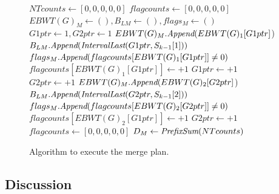 \begin{figure}


	
	\begin{algorithmic}
		
		\State {}
		\State {}
		\State $NTcounts \leftarrow [0,0,0,0,0]$
		\State $flagcounts \leftarrow [0,0,0,0,0]$
		\State $EBWT(G)_M \leftarrow (), B_{LM} \leftarrow (), flags_M \leftarrow ()$
		\State $G1ptr \leftarrow 1, G2ptr \leftarrow 1$
		\State $EBWT(G)_M.\emph{Append}(EBWT(G)_1[G1ptr]$)
		\State $B_{LM}.\emph{Append}(\emph{IntervalLast}(G1ptr, S_{k-1}[1]))$
		\State $flags_M.\emph{Append}(flagcounts[EBWT(G)_1[G1ptr]] \neq 0)$
		\State $flagcounts[EBWT(G)_1[G1ptr]] \leftarrow +1$
		\State $G1ptr \leftarrow +1$
		\State $G2ptr \leftarrow +1$
		\EndIf
		\Else
		\State $EBWT(G)_M.\emph{Append}(EBWT(G)_2[G2ptr]$)
		\State $B_{LM}.\emph{Append}(\emph{IntervalLast}(G2ptr, S_{k-1}[2]))$
		\State $flags_M.\emph{Append}(flagcounts[EBWT(G)_2[G2ptr]] \neq 0)$
		\State $flagcounts[EBWT(G)_2[G1ptr]] \leftarrow +1$
		\State $G2ptr \leftarrow +1$
		\EndIf
		\State {}
		\State $flagcounts \leftarrow [0,0,0,0,0]$
		\EndIf
		\EndFor
		\State $D_M \leftarrow \emph{PrefixSum}(NTcounts)$
		\EndProcedure
		
      \end{algorithmic}
      \caption{Algorithm to execute the merge plan.}
      \label{alg:mergeexecute}
\end{figure}









\subsection{Discussion}

